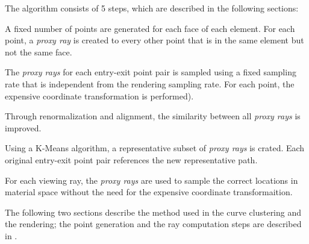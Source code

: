 The algorithm consists of 5 steps, which are described in the following sections:
\begin{description}[leftmargin=10em,style=nextline]
  \item[Point Generation]  A fixed number of points are generated for each face of each element.  For each point, a \emph{proxy ray} is created to every other point that is in the same element but not the same face.
  \item[Ray computation]  The \emph{proxy rays} for each entry-exit point pair is sampled using a fixed sampling rate that is independent from the rendering sampling rate.  For each point, the expensive coordinate transformation is performed).
  \item[Curve Similarity] Through renormalization and alignment, the similarity between all \emph{proxy rays} is improved.
  \item[Curve Clustering] Using a K-Means algorithm, a representative subset of \emph{proxy rays} is crated.  Each original entry-exit point pair references the new representative path.
  \item[Rendering ]       For each viewing ray, the \emph{proxy rays} are used to sample the correct locations in material space without the need for the expensive coordinate transformaition.
\end{description}

The following two sections describe the method used in the curve clustering and the rendering;  the point generation and the ray computation steps are described in .




